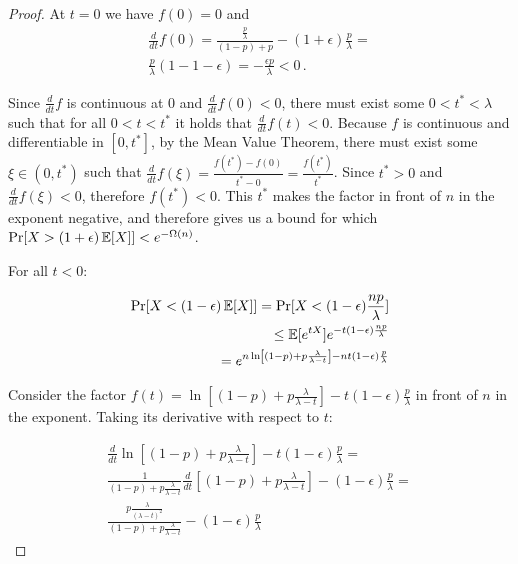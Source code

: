\begin{proof}
  At $t = 0$ we have $f(0) = 0$ and
  \begin{align*}
    \frac{d}{dt} f(0) = \frac{\frac{p}{\lambda}}{(1 - p) + p} - (1 + \epsilon)\frac{p}{\lambda} =\\
    \frac{p}{\lambda}(1 - 1 - \epsilon) = -\frac{\epsilon p}{\lambda} < 0\,.
  \end{align*}

  Since $\frac{d}{dt} f$ is continuous at $0$ and $\frac{d}{dt} f(0) < 0$, there must exist some $0 < t^* < \lambda$ such that for all
  $0 < t < t^*$ it holds that $\frac{d}{dt} f(t) < 0$. Because $f$ is continuous and differentiable in $[0, t^*]$,
  by the Mean Value Theorem, there must exist some $\xi \in (0, t^*)$ such that
  $\frac{d}{dt} f(\xi) = \frac{f(t^*) - f(0)}{t^* - 0} = \frac{f(t^*)}{t^*}$.
  Since $t^* > 0$ and $\frac{d}{dt} f(\xi) < 0$, therefore $f(t^*) < 0$.
  This $t^*$ makes the factor in front of $n$ in the exponent negative, and therefore
  gives us a bound for which $\Pr[X > (1 + \epsilon)\mathop{{}\mathbb{E}}[X]] < e^{-\Omega(n)}$.

  For all $t < 0$:

  \begin{align*}
    \Pr[X < (1 - \epsilon)\mathop{{}\mathbb{E}}[X]] = \Pr[X < (1 - \epsilon)\frac{np}{\lambda}]\\
    \leq \mathop{{}\mathbb{E}}[e^{tX}] e^{-t(1 - \epsilon)\frac{np}{\lambda}} \\
    = e^{n \ln\left[(1 - p) + p\frac{\lambda}{\lambda - t}\right] - n t(1 - \epsilon)\frac{p}{\lambda}}
  \end{align*}

  Consider the factor
  $f(t) = \ln\left[(1 - p) + p\frac{\lambda}{\lambda - t}\right] - t(1 - \epsilon)\frac{p}{\lambda}$
  in front of $n$ in the exponent. Taking its derivative with respect to $t$:

  \begin{align*}
    \frac{d}{dt} \ln\left[(1 - p) + p\frac{\lambda}{\lambda - t}\right] - t(1 - \epsilon)\frac{p}{\lambda} = \\
    \frac{1}{(1 - p) + p\frac{\lambda}{\lambda - t}} \frac{d}{dt} \left[(1 - p) + p\frac{\lambda}{\lambda - t}\right] - (1 - \epsilon)\frac{p}{\lambda} = \\
    \frac{p\frac{\lambda}{(\lambda - t)^2}}{(1 - p) + p\frac{\lambda}{\lambda - t}} - (1 - \epsilon)\frac{p}{\lambda}
  \end{align*}


\end{proof}
